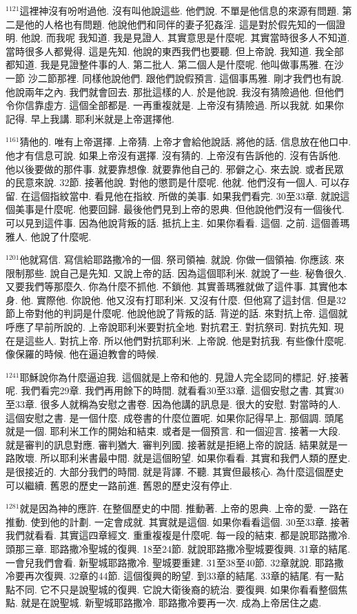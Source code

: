 \documentclass{book}
\begin{document}
$^{1121}$這裡神沒有吩咐過他.
沒有叫他說這些.
他們說.
不單是他信息的來源有問題.
第二是他的人格也有問題.
他說他們和同伴的妻子犯姦淫.
這是對於假先知的一個證明.
他說.
而我呢 我知道.
我是見證人.
其實意思是什麼呢.
其實當時很多人不知道.
當時很多人都覺得.
這是先知.
他說的東西我們也要聽.
但上帝說.
我知道.
我全部都知道.
我是見證整件事的人.
第二批人.
第二個人是什麼呢.
他叫做事馬雅.
在沙一節 沙二節那裡.
同樣他說他們.
跟他們說假預言.
這個事馬雅.
剛才我們也有說.
他說兩年之內.
我們就會回去.
那批這樣的人.
於是他說.
我沒有猜險過他.
但他們令你信靠虛方.
這個全部都是.
一再重複就是.
上帝沒有猜險過.
所以我就.
如果你記得.
早上我講.
耶利米就是上帝選擇他.

$^{1161}$猜他的.
唯有上帝選擇.
上帝猜.
上帝才會給他說話.
將他的話.
信息放在他口中.
他才有信息可說.
如果上帝沒有選擇.
沒有猜的.
上帝沒有告訴他的.
沒有告訴他.
他以後要做的那件事.
就要靠想像.
就要靠他自己的.
邪僻之心.
來去說.
或者民眾的民意來說.
32節.
接著他說.
對他的懲罰是什麼呢.
他就.
他們沒有一個人.
可以存留.
在這個指紋當中.
看見他在指紋.
所做的美事.
如果我們看完.
30至33章.
就說這個美事是什麼呢.
他要回歸.
最後他們見到上帝的恩典.
但他說他們沒有一個後代.
可以見到這件事.
因為他說背叛的話.
抵抗上主.
如果你看看.
這個.
之前.
這個善瑪雅人.
他說了什麼呢.

$^{1201}$他就寫信.
寫信給耶路撒冷的一個.
祭司領袖.
就說.
你做一個領袖.
你應該.
來限制那些.
說自己是先知.
又說上帝的話.
因為這個耶利米.
就說了一些.
秘魯很久.
又要我們等那麼久.
你為什麼不抓他.
不鎖他.
其實善瑪雅就做了這件事.
其實他本身.
他.
實際他.
你說他.
他又沒有打耶利米.
又沒有什麼.
但他寫了這封信.
但是32節上帝對他的判詞是什麼呢.
他說他說了背叛的話.
背逆的話.
來對抗上帝.
這個就呼應了早前所說的.
上帝說耶利米要對抗全地.
對抗君王.
對抗祭司.
對抗先知.
現在是這些人.
對抗上帝.
所以他們對抗耶利米.
上帝說.
他是對抗我.
有些像什麼呢.
像保羅的時候.
他在逼迫教會的時候.

$^{1241}$耶穌說你為什麼逼迫我.
這個就是上帝和他的.
見證人完全認同的標記.
好,接著呢.
我們看完29章.
我們再用餘下的時間.
就看看30至33章.
這個安慰之書.
其實30至33章.
很多人就稱為安慰之書卷.
因為他講的訊息是.
很大的安慰.
對當時的人.
這個安慰之書.
是一個什麼.
成卷書的什麼位置呢.
如果你記得早上.
那個調.
頭尾就是一個.
耶利米工作的開始和結束.
或者是一個預言.
和一個迎言.
接著一大段.
就是審判的訊息對應.
審判猶大.
審判列國.
接著就是拒絕上帝的說話.
結果就是一路敗壞.
所以耶利米書最中間.
就是這個盼望.
如果你看看.
其實和我們人類的歷史.
是很接近的.
大部分我們的時間.
就是背譯.
不聽.
其實但最核心.
為什麼這個歷史可以繼續.
舊恩的歷史一路前進.
舊恩的歷史沒有停止.

$^{1281}$就是因為神的應許.
在整個歷史的中間.
推動著.
上帝的恩典.
上帝的愛.
一路在推動.
使到他的計劃.
一定會成就.
其實就是這個.
如果你看看這個.
30至33章.
接著我們就看看.
其實這四章經文.
重重複複是什麼呢.
每一段的結束.
都是說耶路撒冷.
頭那三章.
耶路撒冷聖城的復興.
18至24節.
就說耶路撒冷聖城要復興.
31章的結尾.
一會兒我們會看.
新聖城耶路撒冷.
聖城要重建.
31至38至40節.
32章就說.
耶路撒冷要再次復興.
32章的44節.
這個復興的盼望.
到33章的結尾.
33章的結尾.
有一點點不同.
它不只是說聖城的復興.
它說大衛後裔的統治.
要復興.
如果你看看整個焦點.
就是在說聖城.
新聖城耶路撒冷.
耶路撒冷要再一次.
成為上帝居住之處.
\end{document}
